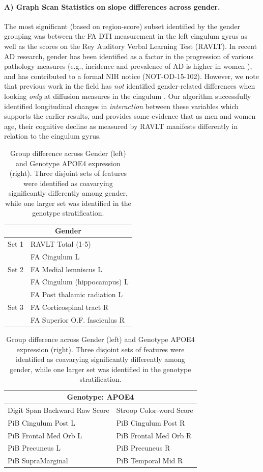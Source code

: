 \paragraph{A) Graph Scan Statistics on slope differences across gender.} 
The most significant (based on region-score) subset identified by the gender grouping was between the FA DTI measurement in the left cingulum gyrus 
as well as the scores on the Rey Auditory Verbal Learning Test (RAVLT). In recent AD research, gender has been identified as a factor in the progression 
of various pathology measures (e.g., incidence and prevalence of AD is higher in women \citep{fratiglioni1991prevalence,rimol2010sex}), and has contributed to a formal NIH notice (NOT-OD-15-102). However, we note that previous work in the field has \textit{not} identified gender-related 
differences when looking {\em only} at diffusion measures in the cingulum \citep{lin2014cingulum}. Our algorithm 
successfully identified longitudinal 
changes in {\em interaction} between these variables which supports the earlier results, and provides some evidence that as men and women age, 
their cognitive decline as measured by RAVLT manifests differently in relation to the cingulum gyrus.
%

\begin{table}
	\centering
	\begin{tabular}[t]{ll}
		\toprule
		\multicolumn{2}{c}{\textbf{Gender}}\\ \midrule \midrule
		
		Set 1     & RAVLT Total (1-5) \\ & FA Cingulum  L	\\
		\midrule
		Set 2 & FA Medial lemniscus L	\\ & FA Cingulum (hippocampus) L		\\
		& FA Post thalamic radiation L \\ \midrule
		Set 3    & FA Corticospinal tract R \\ & FA Superior O.F. fasciculus  R \\	\midrule\bottomrule
	\end{tabular}
	\hfill
	\begin{tabular}[t]{ll}
		\toprule
		\multicolumn{2}{c}{\textbf{Genotype: APOE4}}\\ \midrule \midrule
		Digit Span Backward Raw Score & Stroop Color-word Score \\ 
		PiB Cingulum Post L &    PiB Cingulum Post R         \\
		PiB Frontal Med Orb L & 		PiB Frontal Med Orb R \\ 
		PiB Precuneus L & PiB Precuneus R \\ 
		PiB SupraMarginal &  PiB Temporal Mid R \\ \midrule		 \bottomrule
	\end{tabular}
	\caption[Group differences identified across gender and genotype]{\label{tab:wrapIMG}Group difference across Gender (left) and Genotype APOE4 expression (right). Three disjoint sets of features were identified as coavarying significantly differently among gender, while one larger set was identified in the genotype stratification.}
\end{table}


